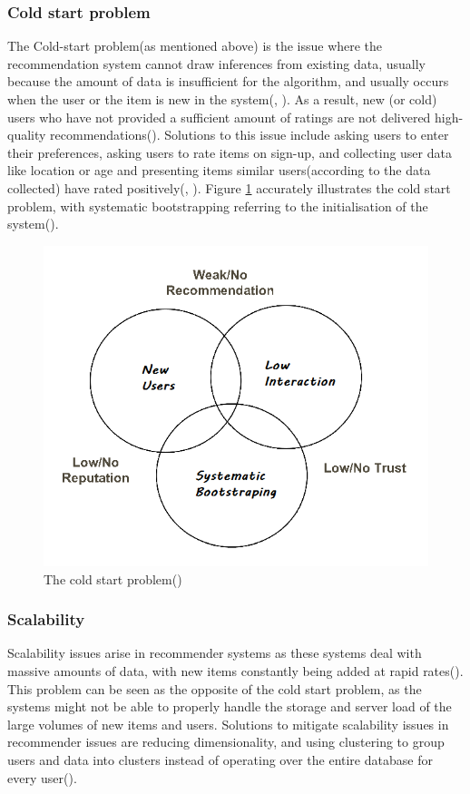 \documentclass{l4proj}
\begin{document}
\subsubsection{Cold start problem}
The Cold-start problem(as mentioned above) is the issue where the recommendation system cannot draw inferences from existing data, usually because the amount of data is insufficient for the algorithm, and usually occurs when the user or the item is new in the system(\cite{Roy_Dutta_2022}, \cite{Schedl_Zamani_Chen_Deldjoo_Elahi_2018}). As a result, new (or cold) users who have not provided a sufficient amount of ratings are not delivered high-quality recommendations(\cite{Roy_Dutta_2022}). Solutions to this issue include asking users to enter their preferences, asking users to rate items on sign-up, and collecting user data like location or age and presenting items similar users(according to the data collected) have rated positively(\cite{Paul_Kundu_2019}, \cite{Roy_Dutta_2022}). Figure \ref{fig:coldstart} accurately illustrates the cold start problem, with systematic bootstrapping referring to the initialisation of the system(\cite{Lendave_2021}).
\begin{figure}
    \centering
    \includegraphics[width=0.75\linewidth]{images/coldstart.png}
    \caption{The cold start problem(\cite{Lendave_2021})}
    \label{fig:coldstart}
\end{figure}
\subsubsection{Scalability}
Scalability issues arise in recommender systems as these systems deal with massive amounts of data, with new items constantly being added at rapid rates(\cite{Roy_Dutta_2022}). This problem can be seen as the opposite of the cold start problem, as the systems might not be able to properly handle the storage and server load of the large volumes of new items and users. Solutions to mitigate scalability issues in recommender issues are reducing dimensionality, and using clustering to group users and data into clusters instead of operating over the entire database for every user(\cite{Roy_Dutta_2022}).
\end{document}

